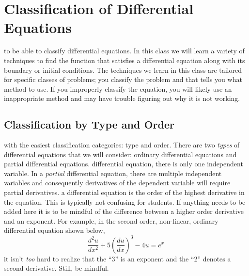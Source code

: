 \section{Classification of Differential Equations}
 to be able to classify differential equations.  In this class we will learn a variety of techniques to find the function that satisfies a differential equation along with its boundary or initial conditions. The techniques we learn in this class are tailored for specific classes of problems; you classify the problem and that tells you what method to use.  If you improperly classify the equation, you will likely use an inappropriate method and may have trouble figuring out why it is not working.  
\subsection{Classification by Type and Order}
 with the easiest classification categories: type and order.  There are two \emph{types} of differential equations that we will consider: ordinary differential equations and partial differential equations.  
 differential equation, there is only one independent variable.  In a \emph{partial} differential equation, there are multiple independent variables and consequently derivatives of the dependent variable will require partial derivatives.
 a differential equation is the order of the highest derivative in the equation.  This is typically not confusing for students. If anything needs to be added here it is to be mindful of the difference between a higher order derivative and an exponent.  For example, in the second order, non-linear, ordinary differential equation shown below, 
$$ \frac{d^2u}{dx^2}+5\left(\frac{du}{dx} \right)^3 - 4u = e^{x}  $$
it isn't \emph{too} hard to realize that the ``3'' is an exponent and the ``2'' denotes a second derivative. Still, be mindful.   

